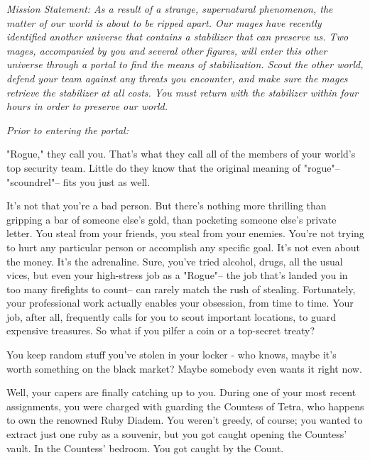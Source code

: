 \documentclass[char]{guildcamp3}
\begin{document}
\name{\cRogueTwo{}}

\em{Mission Statement:} 
As a result of a strange, supernatural phenomenon, the matter of our world is about to be ripped apart. Our mages have recently identified another universe that contains a stabilizer that can preserve us. Two mages, accompanied by you and several other figures, will enter this other universe through a portal to find the means of stabilization. Scout the other world, defend your team against any threats you encounter, and make sure the mages retrieve the stabilizer at all costs. You must return with the stabilizer within four hours in order to preserve our world.

\em{Prior to entering the portal:}

"Rogue," they call you. That's what they call all of the members of your world's top security team. Little do they know that the original meaning of "rogue"-- "scoundrel"-- fits you just as well. 

It's not that you're a bad person. But there's nothing more thrilling than gripping a bar of someone else's gold, than pocketing someone else's private letter. You steal from your friends, you steal from your enemies. You're not trying to hurt any particular person or accomplish any specific goal. It's not even about the money. It's the adrenaline. Sure, you've tried alcohol, drugs, all the usual vices, but even your high-stress job as a "Rogue"-- the job that's landed you in too many firefights to count-- can rarely match the rush of stealing. Fortunately, your professional work actually enables your obsession, from time to time. Your job, after all, frequently calls for you to scout important locations, to guard expensive treasures. So what if you pilfer a coin or a top-secret treaty? 

You keep random stuff you've stolen in your locker - who knows, maybe it's worth something on the black market? Maybe somebody even wants it right now.

Well, your capers are finally catching up to you. During one of your most recent assignments, you were charged with guarding the Countess of Tetra, who happens to own the renowned Ruby Diadem. You weren't greedy, of course; you wanted to extract just one ruby as a souvenir, but you got caught opening the Countess' vault. In the Countess' bedroom. You got caught by the Count.
\end{document}
